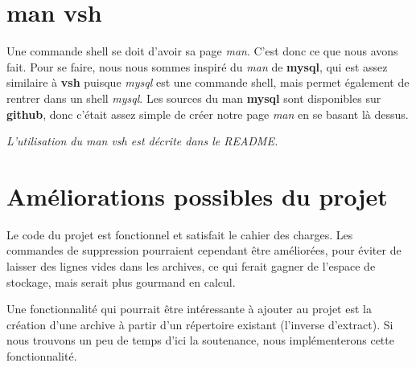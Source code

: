 \documentclass[titlepage]{article}
\begin{document}
	\section{man vsh}

	Une commande shell se doit d'avoir sa page \textit{man}. C'est donc ce que nous avons fait. Pour se faire, nous nous sommes inspiré du \textit{man} de \textbf{mysql}, qui est assez similaire à \textbf{vsh} puisque \textit{mysql} est une commande shell, mais permet également de rentrer dans un shell \textit{mysql}. Les sources du man \textbf{mysql} sont disponibles sur \textbf{github}, donc c'était assez simple de créer notre page \textit{man} en se basant là dessus.

	\textit{L'utilisation du man vsh est décrite dans le README.}

	\section{Améliorations possibles du projet}

	Le code du projet est fonctionnel et satisfait le cahier des charges. Les commandes de suppression pourraient cependant être améliorées, pour éviter de laisser des lignes vides dans les archives, ce qui ferait gagner de l'espace de stockage, mais serait plus gourmand en calcul.

	Une fonctionnalité qui pourrait être intéressante à ajouter au projet est la création d'une archive à partir d'un répertoire existant (l'inverse d'extract). Si nous trouvons un peu de temps d'ici la soutenance, nous implémenterons cette fonctionnalité.
\end{document}

